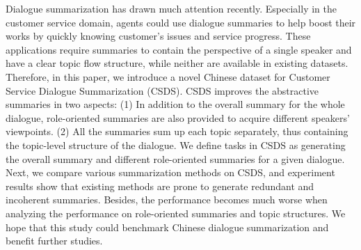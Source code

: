 Dialogue summarization has drawn much attention recently. Especially in the customer service domain, agents could use dialogue summaries to help boost their works by quickly knowing customer's issues and service progress. These applications require summaries to contain the perspective of a single speaker and have a clear topic flow structure, while neither are available in existing datasets. Therefore, in this paper, we introduce a novel Chinese dataset for Customer Service Dialogue Summarization (CSDS). CSDS improves the abstractive summaries in two aspects: (1) In addition to the overall summary for the whole dialogue, role-oriented summaries are also provided to acquire different speakers' viewpoints. (2) All the summaries sum up each topic separately, thus containing the topic-level structure of the dialogue. We define tasks in CSDS as generating the overall summary and different role-oriented summaries for a given dialogue. Next, we compare various summarization methods on CSDS, and experiment results show that existing methods are prone to generate redundant and incoherent summaries. Besides, the performance becomes much worse when analyzing the performance on role-oriented summaries and topic structures. We hope that this study could benchmark Chinese dialogue summarization and benefit further studies.

